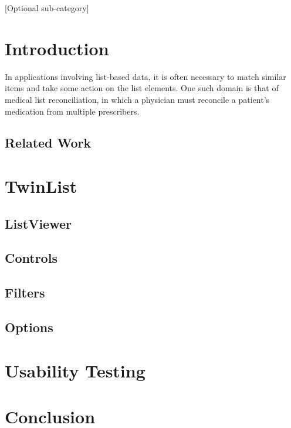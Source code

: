 \documentclass{chi2009}
\begin{document}

[Optional sub-category]


\section{Introduction}
In applications involving list-based data, it is often necessary to match similar items and take some action on the list elements. One such domain is that of medical list reconciliation, in which a physician must reconcile a patient's medication from multiple prescribers.

\subsection{Related Work}

\section{TwinList}

\subsection{ListViewer}

\subsection{Controls}

\subsection{Filters}

\subsection{Options}

\section{Usability Testing}

\section{Conclusion}



\end{document}
